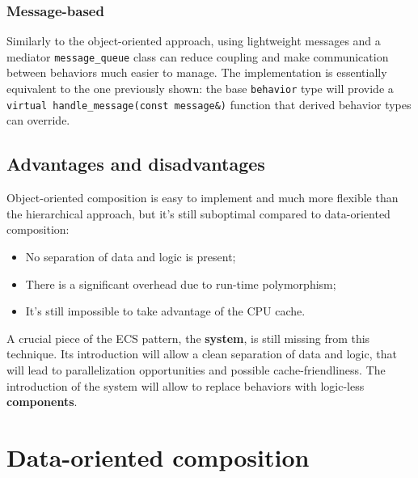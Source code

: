 \documentclass[oneside, 12pt, a4paper, openany]{book}
\begin{document}
\subsubsection{Message-based}\label{message-based-1}

Similarly to the object-oriented approach, using lightweight messages
and a mediator
\texttt{message_queue}
class can reduce coupling and make communication between behaviors much
easier to manage. The implementation is essentially equivalent to the
one previously shown: the base
\texttt{behavior}
type will provide a
\texttt{virtual handle_message(const message&)}
function that derived behavior types can override.

\subsection{Advantages and
disadvantages}\label{advantages-and-disadvantages-1}

Object-oriented composition is easy to implement and much more flexible
than the hierarchical approach, but it's still suboptimal compared to
data-oriented composition:

\begin{itemize}
\item
  No separation of data and logic is present;
\item
  There is a significant overhead due to run-time polymorphism;
\item
  It's still impossible to take advantage of the CPU cache.
\end{itemize}

A crucial piece of the ECS pattern, the \textbf{system}, is still
missing from this technique. Its introduction will allow a clean
separation of data and logic, that will lead to parallelization
opportunities and possible cache-friendliness. The introduction of the
system will allow to replace behaviors with logic-less
\textbf{components}.

\section{Data-oriented composition}\label{data-oriented-composition}
\end{document}
